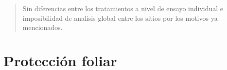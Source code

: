 \documentclass[
  letterpaper,
  DIV=11,
  numbers=noendperiod]{scrreprt}
\begin{document}
\begin{quote}
Sin diferencias entre los tratamientos a nivel de ensayo individual e
imposibilidad de analisis global entre los sitios por los motivos ya
mencionados.
\end{quote}


\hypertarget{protecciuxf3n-foliar}{%
\chapter{Protección foliar}\label{protecciuxf3n-foliar}}

 
  \providecommand{\huxb}[2]{\arrayrulecolor[RGB]{#1}\global\arrayrulewidth=#2pt}
  \providecommand{\huxvb}[2]{\color[RGB]{#1}\vrule width #2pt}
  \providecommand{\huxtpad}[1]{\rule{0pt}{#1}}
  \providecommand{\huxbpad}[1]{\rule[-#1]{0pt}{#1}}
\end{document}

